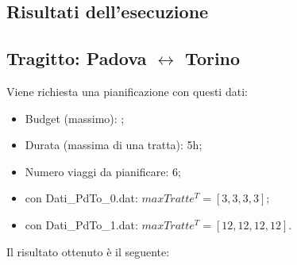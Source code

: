 \documentclass[main.tex]{subfiles}
\begin{document}
\subsection{Risultati dell'esecuzione}
\subsection*{Tragitto: Padova $\leftrightarrow$ Torino}
Viene richiesta una pianificazione con questi dati:
\begin{itemize}
    \item Budget (massimo): ;
    \item Durata (massima di una tratta): 5h;
    \item Numero viaggi da pianificare: 6;
    \item con Dati\_PdTo\_0.dat: $maxTratte^T = [3,3,3,3]$;
    \item con Dati\_PdTo\_1.dat: $maxTratte^T = [12,12,12,12]$.
\end{itemize}
Il risultato ottenuto è il seguente:
\end{document}
